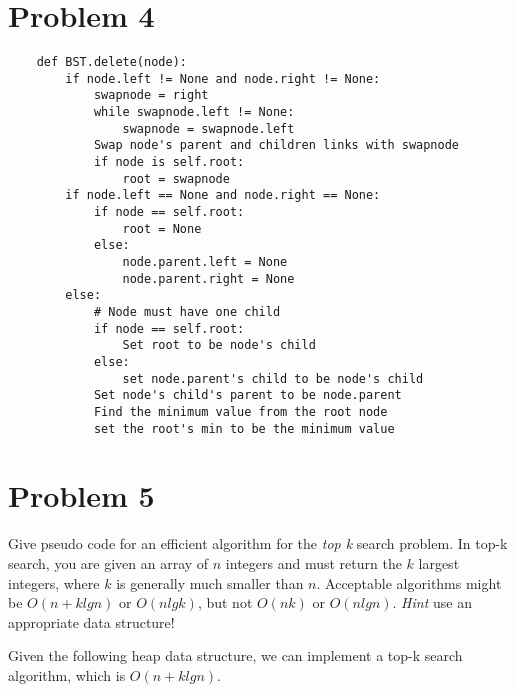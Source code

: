 \documentclass[12pt, letterpaper]{article}
\begin{document}
\break
\section*{Problem 4}

\begin{verbatim}
    def BST.delete(node):
        if node.left != None and node.right != None:
            swapnode = right
            while swapnode.left != None:
                swapnode = swapnode.left
            Swap node's parent and children links with swapnode
            if node is self.root:
                root = swapnode
        if node.left == None and node.right == None:
            if node == self.root:
                root = None
            else:
                node.parent.left = None
                node.parent.right = None
        else:
            # Node must have one child
            if node == self.root:
                Set root to be node's child
            else:
                set node.parent's child to be node's child
            Set node's child's parent to be node.parent
            Find the minimum value from the root node
            set the root's min to be the minimum value
\end{verbatim}

\break
\section*{Problem 5}

Give pseudo code for an efficient algorithm for the \textit{ top k} search problem.
In top-k search, you are given an array of $n$ integers and must return the $k$
largest integers, where $k$ is generally much smaller than $n$.  Acceptable
algorithms might be $O(n+klgn)$ or $O(nlgk)$, but not $O(nk)$ or $O(nlgn)$.
\textit{Hint} use an appropriate data structure!

\vspace{0.5em}

\noindent
Given the following heap data structure, we can implement a top-k search algorithm, which is $O(n+klgn)$.
\end{document}
